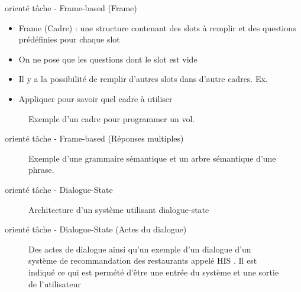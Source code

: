 \documentclass{KodeBook}
\begin{document}

orienté tâche - Frame-based (Frame)
	\begin{itemize}
	\item Frame (Cadre) : une structure contenant des slots à remplir et des questions prédéfinies pour chaque slot
	\item On ne pose que les questions dont le slot est vide
	\item Il y a la possibilité de remplir d'autres slots dans d'autre cadres. 
	Ex. 
	\item Appliquer  pour savoir quel cadre à utiliser
\end{itemize}

\begin{figure}
	\centering
	\caption{Exemple d'un cadre pour programmer un vol. \cite{2020-jurafsky-martin}}
\end{figure}

orienté tâche - Frame-based (Réponses multiples)
\begin{figure}
	\centering
	
	\caption{Exemple d'une grammaire sémantique et un arbre sémantique d'une phrase. \cite{2020-jurafsky-martin}}
\end{figure}

orienté tâche - Dialogue-State
\begin{figure}
	\centering
	\caption{Architecture d'un système utilisant dialogue-state \cite{2016-williams-al}}
\end{figure}

orienté tâche - Dialogue-State (Actes du dialogue)
\begin{figure}
	\centering
	
	\vspace{-6pt}
	\caption{Des actes de dialogue ainsi qu'un exemple d'un dialogue d'un système de recommandation des restaurants appelé HIS \cite{2010-young-al}. Il est indiqué ce qui est permété d'être une entrée du système et une sortie de l'utilisateur \cite{2020-jurafsky-martin}}
\end{figure}
\end{document}
